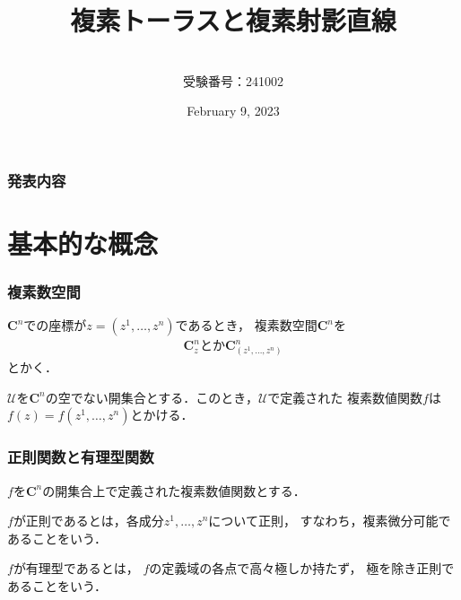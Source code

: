 \documentclass[dvipdfmx,12pt,aspectratio=169]{beamer}%
\newcommand{\cc}{\mathbf{C}}
\newcommand{\mcal}{\mathcal}
\newcommand{\UU}{\mcal{U}}
\begin{document}
    
\title{複素トーラスと複素射影直線}
\date{February 9, 2023}
\author{\\受験番号：241002}


\begin{frame}
    \titlepage
\end{frame}

\begin{frame}\frametitle{発表内容}
    \tableofcontents
\end{frame}

\section{基本的な概念}

\begin{frame}
    \frametitle{複素数空間}

    $\cc^{n}$での座標が$z=(z^{1},\dots,z^{n})$であるとき，
複素数空間$\cc^{n}$を
\begin{align*}
    \cc^{n}_{z} \text{とか} \cc^{n}_{(z^{1},\dots,z^{n})}
\end{align*}
とかく．

$\UU$を$\cc^n$の空でない開集合とする．このとき，$\UU$で定義された
複素数値関数$f$は$f(z)=f(z^{1},\dots,z^{n})$とかける．
\end{frame}

\begin{frame}
    \frametitle{正則関数と有理型関数}

    $f$を$\cc^n$の開集合上で定義された複素数値関数とする．

    \begin{Definition}[正則関数]
        $f$が正則であるとは，各成分$z^1,\ldots,z^n$について正則，
        すなわち，複素微分可能であることをいう．
    \end{Definition}

    \begin{Definition}[有理型関数]
        $f$が有理型であるとは，
        $f$の定義域の各点で高々極しか持たず，
        極を除き正則であることをいう．
    \end{Definition}

\end{frame}
\end{document}
